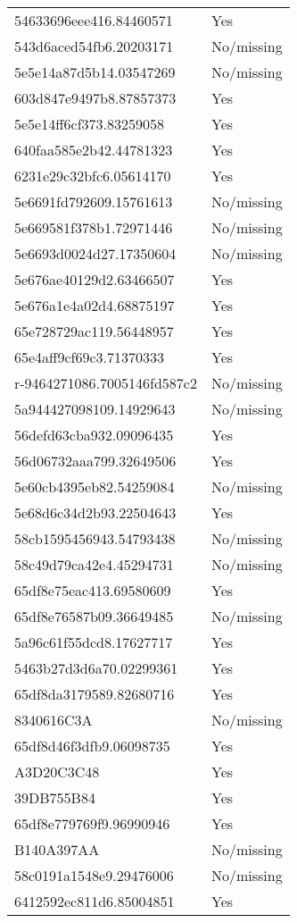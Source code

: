 \begin{tabular}{ll}
54633696eee416.84460571 & Yes \\
543d6aced54fb6.20203171 & No/missing \\
5e5e14a87d5b14.03547269 & No/missing \\
603d847e9497b8.87857373 & Yes \\
5e5e14ff6cf373.83259058 & Yes \\
640faa585e2b42.44781323 & Yes \\
6231e29c32bfc6.05614170 & Yes \\
5e6691fd792609.15761613 & No/missing \\
5e669581f378b1.72971446 & No/missing \\
5e6693d0024d27.17350604 & No/missing \\
5e676ae40129d2.63466507 & Yes \\
5e676a1e4a02d4.68875197 & Yes \\
65e728729ac119.56448957 & Yes \\
65e4aff9cf69c3.71370333 & Yes \\
r-9464271086.7005146fd587c2 & No/missing \\
5a944427098109.14929643 & No/missing \\
56defd63cba932.09096435 & Yes \\
56d06732aaa799.32649506 & Yes \\
5e60cb4395eb82.54259084 & No/missing \\
5e68d6c34d2b93.22504643 & Yes \\
58cb1595456943.54793438 & No/missing \\
58c49d79ca42e4.45294731 & No/missing \\
65df8e75eac413.69580609 & Yes \\
65df8e76587b09.36649485 & No/missing \\
5a96c61f55dcd8.17627717 & Yes \\
5463b27d3d6a70.02299361 & Yes \\
65df8da3179589.82680716 & Yes \\
8340616C3A & No/missing \\
65df8d46f3dfb9.06098735 & Yes \\
A3D20C3C48 & Yes \\
39DB755B84 & Yes \\
65df8e779769f9.96990946 & Yes \\
B140A397AA & No/missing \\
58c0191a1548e9.29476006 & No/missing \\
6412592ec811d6.85004851 & Yes \\

\end{tabular}
